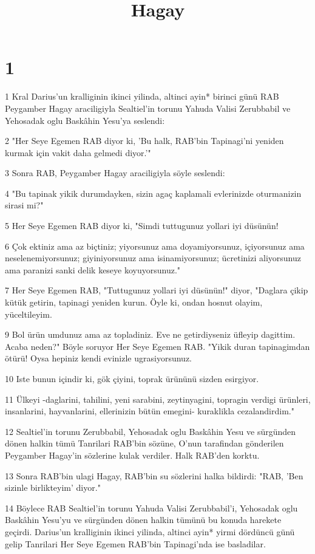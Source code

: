 

\title{Hagay}


\chapter{1}

\par 1 Kral Darius'un kralliginin ikinci yilinda, altinci ayin* birinci günü RAB Peygamber Hagay araciligiyla Sealtiel'in torunu Yahuda Valisi Zerubbabil ve Yehosadak oglu Baskâhin Yesu'ya seslendi:
\par 2 "Her Seye Egemen RAB diyor ki, 'Bu halk, RAB'bin Tapinagi'ni yeniden kurmak için vakit daha gelmedi diyor.'"
\par 3 Sonra RAB, Peygamber Hagay araciligiyla söyle seslendi:
\par 4 "Bu tapinak yikik durumdayken, sizin agaç kaplamali evlerinizde oturmanizin sirasi mi?"
\par 5 Her Seye Egemen RAB diyor ki, "Simdi tuttugunuz yollari iyi düsünün!
\par 6 Çok ektiniz ama az biçtiniz; yiyorsunuz ama doyamiyorsunuz, içiyorsunuz ama neselenemiyorsunuz; giyiniyorsunuz ama isinamiyorsunuz; ücretinizi aliyorsunuz ama paranizi sanki delik keseye koyuyorsunuz."
\par 7 Her Seye Egemen RAB, "Tuttugunuz yollari iyi düsünün!" diyor, "Daglara çikip kütük getirin, tapinagi yeniden kurun. Öyle ki, ondan hosnut olayim, yüceltileyim.
\par 9 Bol ürün umdunuz ama az topladiniz. Eve ne getirdiyseniz üfleyip dagittim. Acaba neden?" Böyle soruyor Her Seye Egemen RAB. "Yikik duran tapinagimdan ötürü! Oysa hepiniz kendi evinizle ugrasiyorsunuz.
\par 10 Iste bunun içindir ki, gök çiyini, toprak ürününü sizden esirgiyor.
\par 11 Ülkeyi -daglarini, tahilini, yeni sarabini, zeytinyagini, topragin verdigi ürünleri, insanlarini, hayvanlarini, ellerinizin bütün emegini- kuraklikla cezalandirdim."
\par 12 Sealtiel'in torunu Zerubbabil, Yehosadak oglu Baskâhin Yesu ve sürgünden dönen halkin tümü Tanrilari RAB'bin sözüne, O'nun tarafindan gönderilen Peygamber Hagay'in sözlerine kulak verdiler. Halk RAB'den korktu.
\par 13 Sonra RAB'bin ulagi Hagay, RAB'bin su sözlerini halka bildirdi: "RAB, 'Ben sizinle birlikteyim' diyor."
\par 14 Böylece RAB Sealtiel'in torunu Yahuda Valisi Zerubbabil'i, Yehosadak oglu Baskâhin Yesu'yu ve sürgünden dönen halkin tümünü bu konuda harekete geçirdi. Darius'un kralliginin ikinci yilinda, altinci ayin* yirmi dördüncü günü gelip Tanrilari Her Seye Egemen RAB'bin Tapinagi'nda ise basladilar.

